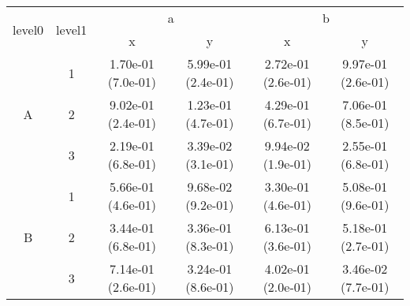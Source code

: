 \begin{tabular}{cccccc}
\toprule
\multirow{2}{*}{level0} & \multirow{2}{*}{level1}&\multicolumn{2}{c}{a}&\multicolumn{2}{c}{b}\tabularnewline
\cmidrule(lr){3-4}
\cmidrule(lr){5-6}
&&x&y&x&y\tabularnewline
\midrule
\multirow{3}{*}{A}&1& 1.70e-01 (7.0e-01)& 5.99e-01 (2.4e-01)& 2.72e-01 (2.6e-01)& 9.97e-01 (2.6e-01)\tabularnewline
&2& 9.02e-01 (2.4e-01)& 1.23e-01 (4.7e-01)& 4.29e-01 (6.7e-01)& 7.06e-01 (8.5e-01)\tabularnewline
&3& 2.19e-01 (6.8e-01)& 3.39e-02 (3.1e-01)& 9.94e-02 (1.9e-01)& 2.55e-01 (6.8e-01)\tabularnewline
\midrule
\multirow{3}{*}{B}&1& 5.66e-01 (4.6e-01)& 9.68e-02 (9.2e-01)& 3.30e-01 (4.6e-01)& 5.08e-01 (9.6e-01)\tabularnewline
&2& 3.44e-01 (6.8e-01)& 3.36e-01 (8.3e-01)& 6.13e-01 (3.6e-01)& 5.18e-01 (2.7e-01)\tabularnewline
&3& 7.14e-01 (2.6e-01)& 3.24e-01 (8.6e-01)& 4.02e-01 (2.0e-01)& 3.46e-02 (7.7e-01)\tabularnewline
\bottomrule
\end{tabular}
